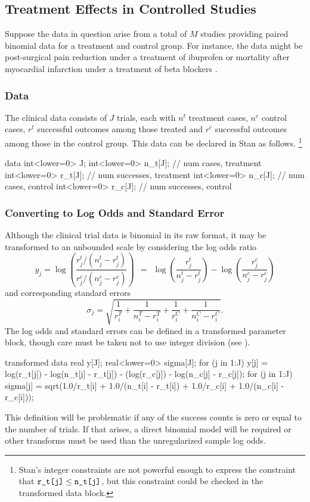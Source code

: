 \subsection{Treatment Effects in Controlled Studies}

Suppose the data in question arise from a total of $M$ studies
providing paired binomial data for a treatment and control group.  For
instance, the data might be post-surgical pain reduction under a treatment
of ibuprofen \citep{WarnThompsonSpiegelhalter:2002} or mortality after
myocardial infarction under a treatment of beta blockers
\citep[Section~5.6]{GelmanEtAl:2013}.

\subsubsection{Data}

The clinical data consists of $J$ trials, each with $n^t$ treatment
cases, $n^c$ control cases, $r^t$ successful outcomes among those treated and
$r^c$ successful outcomes among those in the control group.  This data
can be declared in Stan as follows.%
%
\footnote{Stan's integer constraints are not powerful enough to express the
constraint that $\mbox{\code{r\_t[j]}} \leq \mbox{\code{n\_t[j]}}$,
but this constraint could be checked in the transformed data block.}
%
\begin{stancode}
data {
  int<lower=0> J;
  int<lower=0> n_t[J];  // num cases, treatment
  int<lower=0> r_t[J];  // num successes, treatment
  int<lower=0> n_c[J];  // num cases, control
  int<lower=0> r_c[J];  // num successes, control
}
\end{stancode}
%

\subsubsection{Converting to Log Odds and Standard Error}

Although the clinical trial data is binomial in its raw format, it may
be transformed to an unbounded scale by considering the log odds ratio
\[
y_j = \log \left( \frac{r^t_j / (n^t_j - r^t_j)}
                       {r^c_j / (n^c_j - r^c_j)} \right)
\ \ = \ \ 
\log \left( \frac{r^t_j}{n^t_j - r^t_j} \right)
- 
\log \left( \frac{r^c_j}{n^c_j - r^c_j} \right)
\]
and corresponding standard errors
\[
\sigma_j = \sqrt{
\frac{1}{r^T_i} 
+ \frac{1}{n^T_i - r^T_i}
+ \frac{1}{r^C_i} 
+ \frac{1}{n^C_i - r^C_i}
}.
\]
%
The log odds and standard errors can be defined in a
transformed parameter block, though care must be taken not to use
integer division (see \refsection{int-arithmetic}).
%
\begin{stancode}
transformed data {
  real y[J];
  real<lower=0> sigma[J];
  for (j in 1:J) 
    y[j] = log(r_t[j]) - log(n_t[j] - r_t[j])
            - (log(r_c[j]) - log(n_c[j] - r_c[j]);
  for (j in 1:J)
    sigma[j] = sqrt(1.0/r_t[i] + 1.0/(n_t[i] - r_t[i])
                     + 1.0/r_c[i] + 1.0/(n_c[i] - r_c[i]));
}
\end{stancode}
%
This definition will be problematic if any of the success counts is 
zero or equal to the number of trials.
If that arises, a direct binomial model will be required or other
transforms must be used than the unregularized sample log odds.

